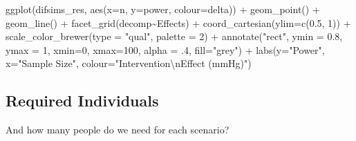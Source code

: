 \documentclass[
]{article}
\newenvironment{Shaded}{\begin{snugshade}}{\end{snugshade}}
\newcommand{\AttributeTok}[1]{\textcolor[rgb]{0.77,0.63,0.00}{#1}}
\newcommand{\DecValTok}[1]{\textcolor[rgb]{0.00,0.00,0.81}{#1}}
\newcommand{\FloatTok}[1]{\textcolor[rgb]{0.00,0.00,0.81}{#1}}
\newcommand{\FunctionTok}[1]{\textcolor[rgb]{0.00,0.00,0.00}{#1}}
\newcommand{\NormalTok}[1]{#1}
\newcommand{\SpecialCharTok}[1]{\textcolor[rgb]{0.00,0.00,0.00}{#1}}
\newcommand{\StringTok}[1]{\textcolor[rgb]{0.31,0.60,0.02}{#1}}
\begin{document}
\begin{Shaded}
\begin{Highlighting}[]
\FunctionTok{ggplot}\NormalTok{(difsims\_res, }\FunctionTok{aes}\NormalTok{(}\AttributeTok{x=}\NormalTok{n, }\AttributeTok{y=}\NormalTok{power, }\AttributeTok{colour=}\NormalTok{delta)) }\SpecialCharTok{+}
  \FunctionTok{geom\_point}\NormalTok{() }\SpecialCharTok{+} 
  \FunctionTok{geom\_line}\NormalTok{() }\SpecialCharTok{+}
  \FunctionTok{facet\_grid}\NormalTok{(decomp}\SpecialCharTok{\textasciitilde{}}\NormalTok{Effects) }\SpecialCharTok{+}
  \FunctionTok{coord\_cartesian}\NormalTok{(}\AttributeTok{ylim=}\FunctionTok{c}\NormalTok{(}\FloatTok{0.5}\NormalTok{, }\DecValTok{1}\NormalTok{)) }\SpecialCharTok{+}
  \FunctionTok{scale\_color\_brewer}\NormalTok{(}\AttributeTok{type =} \StringTok{"qual"}\NormalTok{, }\AttributeTok{palette =} \DecValTok{2}\NormalTok{) }\SpecialCharTok{+}
  \FunctionTok{annotate}\NormalTok{(}\StringTok{"rect"}\NormalTok{, }\AttributeTok{ymin =} \FloatTok{0.8}\NormalTok{, }\AttributeTok{ymax =} \DecValTok{1}\NormalTok{, }\AttributeTok{xmin=}\DecValTok{0}\NormalTok{, }
           \AttributeTok{xmax=}\DecValTok{100}\NormalTok{, }\AttributeTok{alpha =}\NormalTok{ .}\DecValTok{4}\NormalTok{, }\AttributeTok{fill=}\StringTok{"grey"}\NormalTok{) }\SpecialCharTok{+}
  \FunctionTok{labs}\NormalTok{(}\AttributeTok{y=}\StringTok{"Power"}\NormalTok{, }\AttributeTok{x=}\StringTok{"Sample Size"}\NormalTok{, }
       \AttributeTok{colour=}\StringTok{"Intervention}\SpecialCharTok{\textbackslash{}n}\StringTok{Effect (mmHg)"}\NormalTok{)}
\end{Highlighting}
\end{Shaded}

\hypertarget{required-individuals}{%
\subsection{Required Individuals}\label{required-individuals}}

And how many people do we need for each scenario?
\end{document}
